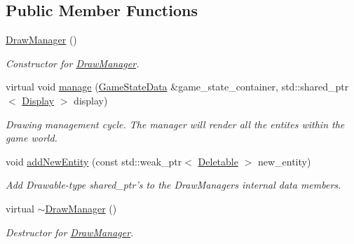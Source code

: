 \subsection*{Public Member Functions}
\begin{DoxyCompactItemize}
\item 
\hyperlink{class_draw_manager_a9a1e8b606471661af565479f7366bf21}{Draw\+Manager} ()
\begin{DoxyCompactList}\small\item\em Constructor for \hyperlink{class_draw_manager}{Draw\+Manager}. \end{DoxyCompactList}\item 
\hypertarget{class_draw_manager_a2c48a7d348b9f6961f2b615015dc482f}{virtual void \hyperlink{class_draw_manager_a2c48a7d348b9f6961f2b615015dc482f}{manage} (\hyperlink{class_game_state_data}{Game\+State\+Data} \&game\+\_\+state\+\_\+container, std\+::shared\+\_\+ptr$<$ \hyperlink{class_display}{Display} $>$ display)}\label{class_draw_manager_a2c48a7d348b9f6961f2b615015dc482f}

\begin{DoxyCompactList}\small\item\em Drawing management cycle. The manager will render all the entites within the game world. \end{DoxyCompactList}\item 
\hypertarget{class_draw_manager_aea3804a9564e6185eec3750f5ff4e33f}{void \hyperlink{class_draw_manager_aea3804a9564e6185eec3750f5ff4e33f}{add\+New\+Entity} (const std\+::weak\+\_\+ptr$<$ \hyperlink{class_deletable}{Deletable} $>$ new\+\_\+entity)}\label{class_draw_manager_aea3804a9564e6185eec3750f5ff4e33f}

\begin{DoxyCompactList}\small\item\em Add Drawable-\/type shared\+\_\+ptr's to the Draw\+Managers internal data members. \end{DoxyCompactList}\item 
\hypertarget{class_draw_manager_ab2cbca4d18cb8838662754bb01585a9a}{virtual \hyperlink{class_draw_manager_ab2cbca4d18cb8838662754bb01585a9a}{$\sim$\+Draw\+Manager} ()}\label{class_draw_manager_ab2cbca4d18cb8838662754bb01585a9a}

\begin{DoxyCompactList}\small\item\em Destructor for \hyperlink{class_draw_manager}{Draw\+Manager}. \end{DoxyCompactList}\end{DoxyCompactItemize}


